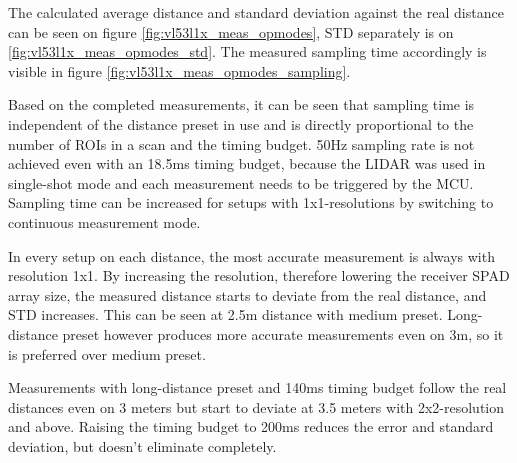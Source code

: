 The calculated average distance and standard deviation against the real distance can be seen on
figure \ref{fig:vl53l1x_meas_opmodes}, STD separately is on \ref{fig:vl53l1x_meas_opmodes_std}.
The measured sampling time accordingly is visible in figure \ref{fig:vl53l1x_meas_opmodes_sampling}.

Based on the completed measurements, it can be seen that sampling time is independent of the
distance preset in use and is directly proportional to the number of ROIs in a scan and the
timing budget. 50Hz sampling rate is not achieved even with an 18.5ms timing budget, because
the LIDAR was used in single-shot mode and each measurement needs to be triggered by the MCU.
Sampling time can be increased for setups with 1x1-resolutions by switching to continuous
measurement mode.

In every setup on each distance, the most accurate measurement is always with
resolution 1x1. By increasing the resolution, therefore lowering the receiver SPAD array size,
the measured distance starts to deviate from the real distance, and STD increases. This can be
seen at 2.5m distance with medium preset. Long-distance preset however produces more accurate
measurements even on 3m, so it is preferred over medium preset.

Measurements with long-distance preset and 140ms timing budget follow the real distances
even on 3 meters but start to deviate at 3.5 meters with 2x2-resolution and above. Raising
the timing budget to 200ms reduces the error and standard deviation, but doesn't eliminate
completely.


